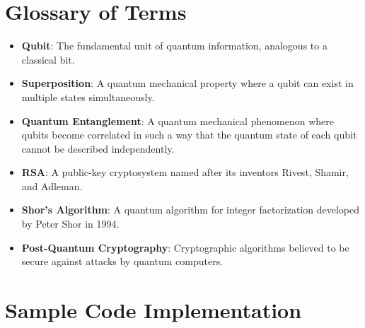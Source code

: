 \documentclass{article}
\begin{document}
\section{Glossary of Terms}
\begin{itemize}
    \item \textbf{Qubit}: The fundamental unit of quantum information, analogous to a classical bit.
    \item \textbf{Superposition}: A quantum mechanical property where a qubit can exist in multiple states simultaneously.
    \item \textbf{Quantum Entanglement}: A quantum mechanical phenomenon where qubits become correlated in such a way that the quantum state of each qubit cannot be described independently.
    \item \textbf{RSA}: A public-key cryptosystem named after its inventors Rivest, Shamir, and Adleman.
    \item \textbf{Shor's Algorithm}: A quantum algorithm for integer factorization developed by Peter Shor in 1994.
    \item \textbf{Post-Quantum Cryptography}: Cryptographic algorithms believed to be secure against attacks by quantum computers.
\end{itemize}

\section{Sample Code Implementation}
\end{document}
